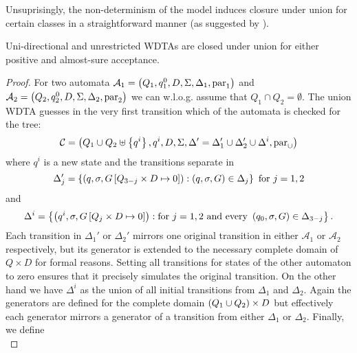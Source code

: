 Unsuprisingly, the non-determinism of the model induces closure under union for 
certain classes in a straightforward manner (as suggested by 
\cite[Proposition 14]{RandAutoInfTrees}). 
\begin{proposition}
  Uni-directional and unrestricted \acp{WDTA} are closed under union for 
  either positive and almost-sure acceptance.
  \label{prop:uniunrunion}
\end{proposition}
\begin{proof}
  For two automata
  $\mathcal{A}_{1} = \left(Q_{1}, q^{0}_{1}, D, \Sigma, \Delta_{1}, 
    \operatorname{par}_{1}\right)$ and $\mathcal{A}_{2} = \left(Q_{2}, q^{0}_{2}, D, \Sigma, 
  \Delta_{2}, \operatorname{par}_{2}\right)$ we can w.l.o.g. assume that 
  $Q_{1}\cap Q_{2} = \emptyset$. The union \ac{WDTA} guesses 
  in the very first transition which of the automata is checked for the tree:
  \begin{equation*}
    \mathcal{C} = \left(Q_{1}\cup Q_{2}\uplus\left\{q^{i}\right\}, q^{i}, D, \Sigma,
    \Delta' = \Delta_{1}'\cup\Delta_{2}'\cup\Delta^{i},\operatorname{par}_{\cup}\right)
  \end{equation*}
  where $q^{i}$ is a new state and the transitions separate in
  \begin{equation*}
    \Delta_{j}' = \left\{
      \left(q,\sigma,G\left[Q_{3-j}\times D\mapsto 0\right]\right):
        \left(q,\sigma,G\right)\in\Delta_{j}
    \right\}\text{ for }j = 1,2
  \end{equation*}
  and
  \begin{equation*}
    \Delta^{i} = \left\{
      \left(q^{i},\sigma,G\left[Q_{j}\times D\mapsto 0\right]\right):
        \text{for }j = 1,2 \text{ and every } 
        \left(q_{0},\sigma,G\right)\in\Delta_{3-j}
    \right\}.
  \end{equation*}
  Each transition in $\Delta_{1}'$ or $\Delta_{2}'$ mirrors one original 
  transition in either $\mathcal{A}_{1}$ or $\mathcal{A}_{2}$ respectively, but
  its generator is extended to the necessary complete domain of $Q\times D$ for
  formal reasons. Setting all transitions for states of the other automaton to
  zero ensures that it precisely simulates the original transition. On the
  other hand we have $\Delta^{i}$ as the union of all initial transitions from 
  $\Delta_{1}$ and $\Delta_{2}$. Again the generators are defined for the 
  complete domain $\left(Q_{1}\cup Q_{2}\right)\times D$ but effectively each
  generator mirrors a generator of a transition from either $\Delta_{1}$ or
  $\Delta_{2}$. Finally, we define
  \begin{equation*}

\end{equation*}
\end{proof}
